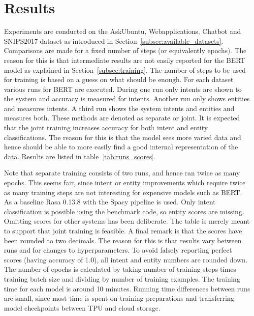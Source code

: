 \section{Results}
\label{sec:results}

Experiments are conducted on the AskUbuntu, Webapplications, Chatbot and SNIPS2017 dataset as introduced in Section~\ref{subsec:available_datasets}.
Comparisons are made for a fixed number of steps (or equivalently epochs).
The reason for this is that intermediate results are not easily reported for the BERT model as explained in Section~\ref{subsec:training}.
The number of steps to be used for training is based on a guess on what should be enough.
For each dataset various runs for BERT are executed.
During one run only intents are shown to the system and accuracy is measured for intents.
Another run only shows entities and measures intents.
A third run shows the system intents and entities and measures both.
These methods are denoted as separate or joint.
It is expected that the joint training increases accuracy for both intent and entity classifications.
The reason for this is that the model sees more varied data and hence should be able to more easily find a good internal representation of the data.
Results are listed in table~\ref{tab:runs_scores}.

Note that separate training consists of two runs, and hence ran twice as many epochs.
This seems fair, since intent or entity improvements which require twice as many training steps are not interesting for expensive models such as BERT.
As a baseline Rasa 0.13.8 with the Spacy pipeline is used.
Only intent classification is possible using the benchmark code, so entity scores are missing.
Omitting scores for other systems has been deliberate.
The table is merely meant to support that joint training is feasible.
A final remark is that the scores have been rounded to two decimals.
The reason for this is that results vary between runs and for changes to hyperparameters.
To avoid falsely reporting perfect scores (having accuracy of 1.0), all intent and entity numbers are rounded down.
The number of epochs is calculated by taking number of training steps times training batch size and dividing by number of training examples.
The training time for each model is around 10 minutes.
Running time differences between runs are small, since most time is spent on training preparations and transferring model checkpoints between TPU and cloud storage.

